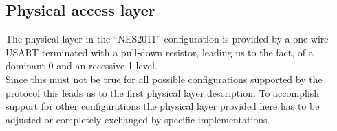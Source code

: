 \subsection{Physical access layer}
\label{sec:bus:design:layer1}
The physical layer in the ``NES2011'' configuration is provided by a one-wire-USART terminated with a pull-down resistor, 
leading us to the fact, of a dominant 0 and an recessive 1 level.\\

Since this must not be true for all possible configurations supported by the protocol this leads
us to the first physical layer description. To accomplish support for other configurations the physical 
layer provided here has to be adjusted or completely exchanged by specific implementations.\\


